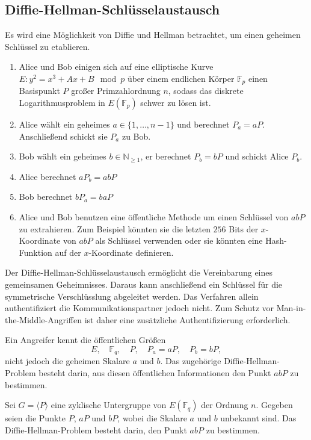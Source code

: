 \subsection{Diffie-Hellman-Schlüsselaustausch}
Es wird eine Möglichkeit von Diffie und Hellman betrachtet, um einen geheimen Schlüssel zu etablieren.
\begin{enumerate}
    \item Alice und Bob einigen sich auf eine elliptische Kurve $E:y^2=x^3+Ax+B\mod p$ über einem endlichen Körper $\mathbb{F}_p$ einen Basispunkt $P$ großer Primzahlordnung $n$, sodass das diskrete Logarithmusproblem in $E(\mathbb{F}_p)$ schwer zu lösen ist.
    \item Alice wählt ein geheimes $a\in \{1,\dots,n-1\}$ und berechnet $P_a=aP$. Anschließend schickt sie $P_a$ zu Bob.
    \item Bob wählt ein geheimes $b\in\mathbb{N}_{\geq1}$, er berechnet $P_b=bP$ und schickt Alice $P_b$.
    \item Alice berechnet $aP_b=abP$
    \item Bob berechnet $bP_a=baP$
    \item Alice und Bob benutzen eine öffentliche Methode um einen Schlüssel von $abP$ zu extrahieren. Zum Beispiel könnten sie die letzten $256$ Bits der $x$-Koordinate von $abP$ als Schlüssel verwenden oder sie könnten eine Hash-Funktion auf der $x$-Koordinate definieren.
\end{enumerate}
\begin{bemerkung}
    Der Diffie-Hellman-Schlüsselaustausch ermöglicht die Vereinbarung eines gemeinsamen Geheimnisses. Daraus kann anschließend ein Schlüssel für die symmetrische Verschlüsslung abgeleitet werden.  Das Verfahren allein authentifiziert die Kommunikationspartner jedoch nicht. Zum Schutz vor Man-in-the-Middle-Angriffen ist daher eine zusätzliche Authentifizierung erforderlich.
\end{bemerkung}
Ein Angreifer kennt die öffentlichen Größen
\[
    E,\quad \mathbb F_q,\quad P,\quad P_a=aP,\quad P_b=bP,
\]
nicht jedoch die geheimen Skalare $a$ und $b$.
Das zugehörige Diffie-Hellman-Problem besteht darin, aus diesen öffentlichen Informationen den Punkt \(abP\) zu bestimmen.
\begin{definition}
    Sei $G=\langle P\rangle$ eine zyklische Untergruppe von $E(\mathbb F_q)$ der Ordnung $n$. Gegeben seien die Punkte $P$, $aP$ und $bP$,
    wobei die Skalare $a$ und $b$ unbekannt sind. Das Diffie-Hellman-Problem besteht darin, den Punkt $abP$ zu bestimmen.
\end{definition}
